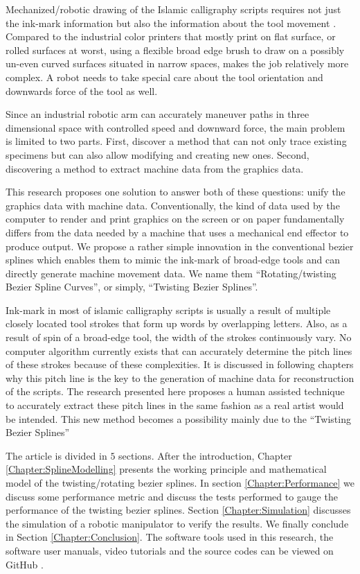 {    Mechanized/robotic drawing of the Islamic calligraphy scripts requires not just the ink-mark information but also the information about the tool movement \cite{bib03}. Compared to the industrial color printers that mostly print on flat surface, or rolled surfaces at worst, using a flexible broad edge brush to draw on a possibly un-even curved surfaces situated in narrow spaces, makes the job relatively more complex. A robot needs to take special care about the tool orientation and downwards force of the tool as well.

    Since an industrial robotic arm can accurately maneuver paths in three dimensional space with controlled speed and downward force, the main problem is limited to two parts. First, discover a method that can not only trace existing specimens but can also allow modifying and creating new ones. Second, discovering a method to extract machine data from the graphics data.


    This research proposes one solution to answer both of these questions: unify the graphics data with machine data. Conventionally, the kind of data used by the computer to render and print graphics on the screen or on paper fundamentally differs from the data needed by a machine that uses a mechanical end effector to produce output. We propose a rather simple innovation in the conventional bezier splines which enables them to mimic the ink-mark of broad-edge tools and can directly generate machine movement data. We name them ``Rotating/twisting Bezier Spline Curves'', or simply, ``Twisting Bezier Splines''.

    Ink-mark in most of islamic calligraphy scripts is usually a result of multiple closely located tool strokes that form up words by overlapping letters. Also, as a result of spin of a broad-edge tool, the width of the strokes continuously vary. No computer algorithm currently exists that can accurately determine the pitch lines of these strokes because of these complexities. It is discussed in following chapters why this pitch line is the key to the generation of machine data for reconstruction of the scripts. The research presented here proposes a human assisted technique to accurately extract these pitch lines in the same fashion as a real artist would be intended. This new method becomes a possibility mainly due to the ``Twisting Bezier Splines''

    The article is divided in $5$ sections. After the introduction, Chapter \ref{Chapter:SplineModelling} presents the working principle and mathematical model of the twisting/rotating bezier splines. In section \ref{Chapter:Performance} we discuss some performance metric and discuss the tests performed to gauge the performance of the twisting bezier splines. Section \ref{Chapter:Simulation} discusses the simulation of a robotic manipulator to verify the results. We finally conclude in Section \ref{Chapter:Conclusion}. The software tools used in this research, the software user manuals, video tutorials and the source codes can be viewed on GitHub \cite{bib20}.
    } 